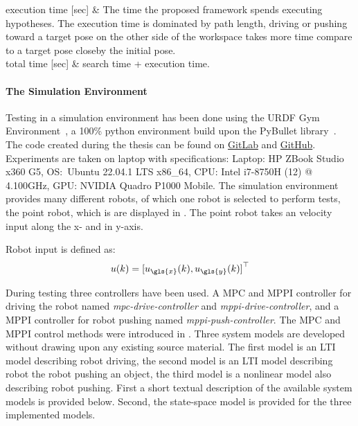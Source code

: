 \begin{table}[H]
\begin{tabular}
execution time [sec] & The time the proposed framework spends executing hypotheses. The execution time is dominated by path length, driving or pushing toward a target pose on the other side of the workspace takes more time compare to a target pose closeby the initial pose.\\ 
total time [sec] & search time + execution time.\\
\end{tabular}
\end{table}

\paragraph{The Simulation Environment}
Testing in a simulation environment has been done using the URDF Gym Environment~\cite{spahn_urdfenvironment_2022}, a 100\% python environment build upon the PyBullet library~\cite{coumans_pybullet_2016}. The code created during the thesis can be found on \href{https://gitlab.tudelft.nl/airlab-delft/msc_projects/msc_gijs_groote}{GitLab} and \href{https://github.com/GijsGroote/semantic-thinking-robot}{GitHub}. Experiments are taken on laptop with specifications: Laptop: HP ZBook Studio x360 G5, OS:~Ubuntu 22.04.1 LTS x86\_64, CPU: Intel i7-8750H (12) @ 4.100GHz, GPU: NVIDIA Quadro P1000 Mobile. The simulation environment provides many different robots, of which one robot is selected to perform tests, the point robot, which is are displayed in . The point robot takes an velocity input along the \gls{x}- and in \gls{y}-axis.\bs

Robot input is defined as:\\
\[ u(k) = {[ u_{\gls{x}}(k), u_{\gls{y}}(k) ]}^\top \]

During testing three controllers have been used. A \ac{MPC} and \ac{MPPI} controller for driving the robot named \textit{mpc-drive-controller} and \textit{mppi-drive-controller}, and a \ac{MPPI} controller for robot pushing named \textit{mppi-push-controller}. The \ac{MPC} and \ac{MPPI} control methods were introduced in . Three system models are developed without drawing upon any existing source material. The first model is an \ac{LTI} model describing robot driving, the second model is an \ac{LTI} model describing robot the robot pushing an object, the third model is a nonlinear model also describing robot pushing. First a short textual description of the available system models is provided below. Second, the state-space model is provided for the three implemented models.\bs

